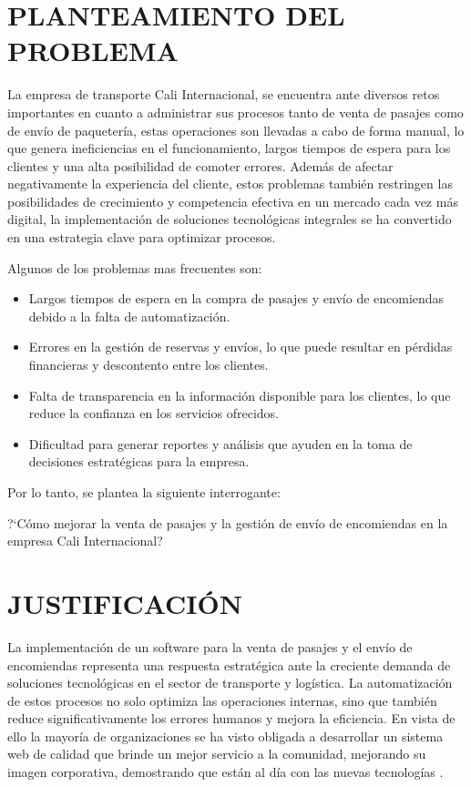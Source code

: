 \documentclass[12pt,letterpaper]{article}
\begin{document}
\section{PLANTEAMIENTO DEL PROBLEMA}

La empresa de transporte Cali Internacional, se encuentra ante diversos retos importantes en cuanto a administrar sus procesos tanto de venta de pasajes como de envío de paquetería, estas operaciones son llevadas a cabo de forma manual, lo que genera ineficiencias en el funcionamiento, largos tiempos de espera para los clientes y una alta posibilidad de comoter errores. Además de afectar negativamente la experiencia del cliente, estos problemas también restringen las posibilidades de crecimiento y competencia efectiva en un mercado cada vez más digital, la implementación de soluciones tecnológicas integrales se ha convertido en una estrategia clave para optimizar procesos.  

Algunos de los problemas mas frecuentes son:

\begin{itemize}[label=$\bullet$, left=1.25cm, labelsep = 0.75cm, topsep = 0pt, parsep = 0pt]
	\item Largos tiempos de espera en la compra de pasajes y envío de encomiendas debido a la falta de automatización.
	\item Errores en la gestión de reservas y envíos, lo que puede resultar en pérdidas financieras y descontento entre los clientes.
	\item Falta de transparencia en la información disponible para los clientes, lo que reduce la confianza en los servicios ofrecidos.
	\item Dificultad para generar reportes y análisis que ayuden en la toma de decisiones estratégicas para la empresa.    
\end{itemize}

Por lo tanto, se plantea la siguiente interrogante:

?`Cómo mejorar la venta de pasajes y la gestión de envío de encomiendas en la empresa Cali Internacional?

\section{JUSTIFICACIÓN}

La implementación de un software para la venta de pasajes y el envío de encomiendas representa una respuesta estratégica ante la creciente demanda de soluciones tecnológicas en el sector de transporte y logística. La automatización de estos procesos no solo optimiza las operaciones internas, sino que también reduce significativamente los errores humanos y mejora la eficiencia. En vista de ello la mayoría de organizaciones se ha visto obligada a desarrollar un sistema web de calidad que brinde un mejor servicio a la comunidad, mejorando su imagen corporativa, demostrando que están al día con las nuevas tecnologías \parencite{nunez2005diseno}.
\end{document}
